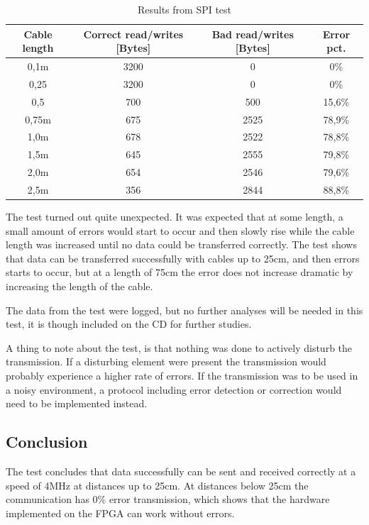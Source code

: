 \begin{table}[htb]								%
	\begin{center}
	\begin{tabular}{c|c|c|c}					%
	Cable length & Correct read/writes [Bytes] & Bad read/writes [Bytes] & Error pct. \\			%
	\hline													%
	0,1m & 3200 & 0 & 0\%  \\
	0,25 & 3200 & 0 & 0\% \\
	0,5 & 700 & 500 & 15,6\% \\
	0,75m & 675 & 2525 & 78,9\% \\
	1,0m & 678 & 2522 & 78,8\% \\
	1,5m & 645 & 2555 & 79,8\% \\
	2,0m & 654 & 2546 & 79,6\% \\
	2,5m & 356 & 2844 & 88,8\%
	\end{tabular}
	\end{center}
	\caption{Results from SPI test}				%
	\label{tab:spi_test_results}			%
\end{table}


The test turned out quite unexpected. It was expected that at some length, a small amount of errors would start to occur and then slowly rise while the cable length was increased until no data could be transferred correctly. The test shows that data can be transferred successfully with cables up to 25cm, and then errors starts to occur, but at a length of 75cm the error does not increase dramatic by increasing the length of the cable.

The data from the test were logged, but no further analyses will be needed in this test, it is though included on the CD for further studies.

A thing to note about the test, is that nothing was done to actively disturb the transmission. If a disturbing element were present the transmission would probably experience a higher rate of errors. If the transmission was to be used in a noisy environment, a protocol including error detection or correction would need to be implemented instead.


\subsection{Conclusion}
The test concludes that data successfully can be sent and received correctly at a speed of 4MHz at distances up to 25cm. At distances below 25cm the communication has 0\% error transmission, which shows that the hardware implemented on the FPGA can work without errors.
